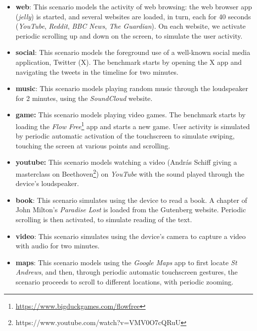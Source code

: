 \documentclass[conference]{IEEEtran}
\begin{document}
    \begin{itemize}

\item \textbf{web}: This scenario models the activity of web browsing: the web browser app (\emph{jelly}) is started, and several websites are loaded, in turn, each for 40 seconds (\emph{YouTube}, \emph{Reddit}, \emph{BBC News}, \emph{The Guardian}). On each website, we activate periodic scrolling up and down on the screen, to simulate the user activity.
    
\item \textbf{social}: This scenario models the foreground use of a well-known social media application, Twitter (X). The benchmark starts by opening the X app and navigating the tweets in the timeline for two minutes. 

\item \textbf{music}: This scenario models playing random music through the loudspeaker for 2 minutes, using the \emph{SoundCloud} website. 

\item \textbf{game:} This scenario models playing video games. The benchmark starts by loading the \emph{Flow Free}\footnote{\url{https://www.bigduckgames.com/flowfree}} app and starts a new game. User activity is simulated by periodic automatic activation of the touchscreen to simulate swiping, touching the screen at various points and scrolling. 


\item \textbf{youtube:} This scenario models watching a video (Andr\'{a}s Schiff giving a masterclass on Beethoven\footnote{https://www.youtube.com/watch?v=VMV0O7cQRuU}) on \emph{YouTube} with the sound played through the device's loudspeaker. 

\item \textbf{book}: This scenario simulates using the device to read a book. A chapter of John Milton's \emph{Paradise Lost} is loaded from the Gutenberg website. Periodic scrolling is then activated, to simulate reading of the text. 

\item \textbf{video}: This scenario simulates using the device's camera to capture a video with audio for two minutes. 

\item \textbf{maps}: This scenario models using the \emph{Google Maps} app to first locate \emph{St Andrews}, and then, through periodic automatic touchscreen gestures, the scenario proceeds to scroll to different locations, with periodic zooming. 


\end{itemize}
\end{document}
